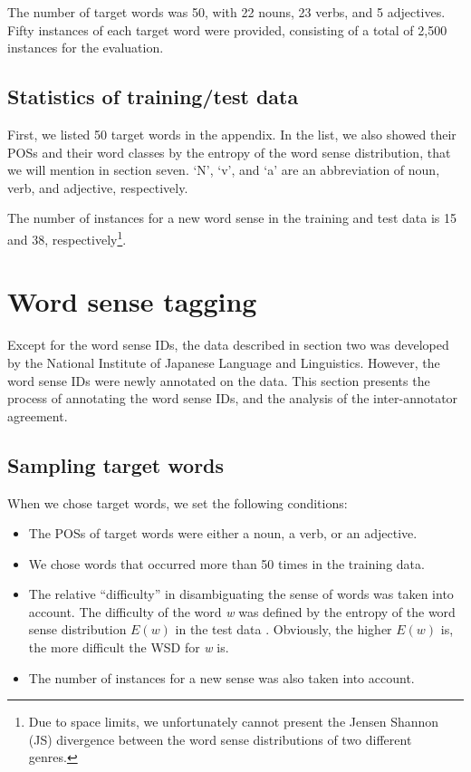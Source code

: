 \documentclass[english]{jnlp_1.4}
\begin{document}
The number of target words was 50, with 22 nouns, 23 verbs, and 5
adjectives. Fifty instances of each target word were provided,
consisting of a total of 2,500 instances for the evaluation.


\subsection{Statistics of training/test data}

First, we listed 50 target words in the appendix. In the list, we
also showed their POSs and their word classes by the entropy of the
word sense distribution, that we will mention in section seven. `N', `v',
and `a' are an abbreviation of noun, verb, and adjective, respectively.

The number of instances for a new word sense in the training and test
data is 15 and 38, respectively\footnote{
Due to space limits, we unfortunately cannot present the
Jensen Shannon (JS)
divergence \cite{lin:91:a,dagan:97:a} between the word sense
distributions of two different genres.}.


\section{Word sense tagging}

Except for the word sense IDs, the data described in section two was
developed by the National Institute of Japanese Language and Linguistics. However, the
word sense IDs were newly annotated on the data. This
section presents the process of annotating the word sense IDs, and the
analysis of the inter-annotator agreement.


\subsection{Sampling target words}

When we chose target words, we set the following conditions:
\begin{itemize}
\item The POSs of target words were either a noun, a verb, or an adjective.
\item We chose words that occurred more than 50 times in the
training data.
\item The relative ``difficulty'' in disambiguating the sense of words
      was taken into account. 
\pagebreak
 The difficulty of the word {\it w} was defined by the
      entropy of the word sense distribution $E(w)$ in the test
      data \cite{kilgarriff:00:a}. Obviously, the higher $E(w)$ is, the
      more difficult the WSD for {\it w} is.
\item The number of instances for a new sense was also taken into account.
\end{itemize}
\end{document}
